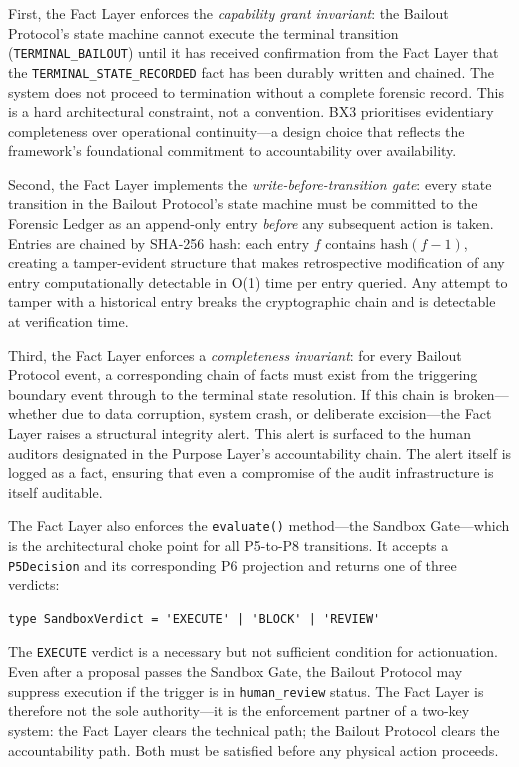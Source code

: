 First, the Fact Layer enforces the \emph{capability grant invariant}: the Bailout Protocol's state machine cannot execute the terminal transition (\texttt{TERMINAL\_BAILOUT}) until it has received confirmation from the Fact Layer that the \texttt{TERMINAL\_STATE\_RECORDED} fact has been durably written and chained. The system does not proceed to termination without a complete forensic record. This is a hard architectural constraint, not a convention. BX3 prioritises evidentiary completeness over operational continuity---a design choice that reflects the framework's foundational commitment to accountability over availability.

Second, the Fact Layer implements the \emph{write-before-transition gate}: every state transition in the Bailout Protocol's state machine must be committed to the Forensic Ledger as an append-only entry \emph{before} any subsequent action is taken. Entries are chained by SHA-256 hash: each entry $f$ contains $\text{hash}(f-1)$, creating a tamper-evident structure that makes retrospective modification of any entry computationally detectable in O(1) time per entry queried. Any attempt to tamper with a historical entry breaks the cryptographic chain and is detectable at verification time.

Third, the Fact Layer enforces a \emph{completeness invariant}: for every Bailout Protocol event, a corresponding chain of facts must exist from the triggering boundary event through to the terminal state resolution. If this chain is broken---whether due to data corruption, system crash, or deliberate excision---the Fact Layer raises a structural integrity alert. This alert is surfaced to the human auditors designated in the Purpose Layer's accountability chain. The alert itself is logged as a fact, ensuring that even a compromise of the audit infrastructure is itself auditable.

The Fact Layer also enforces the \texttt{evaluate()} method---the Sandbox Gate---which is the architectural choke point for all P5-to-P8 transitions. It accepts a \texttt{P5Decision} and its corresponding P6 projection and returns one of three verdicts:

\begin{verbatim}
type SandboxVerdict = 'EXECUTE' | 'BLOCK' | 'REVIEW'
\end{verbatim}

The \texttt{EXECUTE} verdict is a necessary but not sufficient condition for actionuation. Even after a proposal passes the Sandbox Gate, the Bailout Protocol may suppress execution if the trigger is in \texttt{human\_review} status. The Fact Layer is therefore not the sole authority---it is the enforcement partner of a two-key system: the Fact Layer clears the technical path; the Bailout Protocol clears the accountability path. Both must be satisfied before any physical action proceeds.

